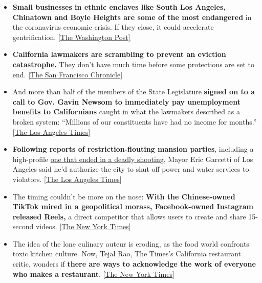 \begin{itemize}
\item
  \textbf{Small businesses in ethnic enclaves like South Los Angeles,
  Chinatown and Boyle Heights are some of the most endangered} in the
  coronavirus economic crisis. If they close, it could accelerate
  gentrification.
  {[}\href{https://www.washingtonpost.com/business/2020/07/31/ethnic-enclaves-gentrification-coronavirus/?arc404=true}{The
  Washington Post{]}}
\item
  \textbf{California lawmakers are scrambling to prevent an eviction
  catastrophe.} They don't have much time before some protections are
  set to end.
  {[}\href{https://www.sfchronicle.com/politics/article/Rent-is-coming-due-in-California-Two-weeks-to-15452787.php}{The
  San Francisco Chronicle}{]}
\item
  And more than half of the members of the State Legislature
  \textbf{signed on to a call to Gov. Gavin Newsom to immediately pay
  unemployment benefits to Californians} caught in what the lawmakers
  described as a broken system: ``Millions of our constituents have had
  no income for months.''
  {[}\href{https://www.latimes.com/california/story/2020-08-05/california-legislature-edd-changes-unemployment-benefits-newsom}{The
  Los Angeles Times}{]}
\item
  \textbf{Following reports of restriction-flouting mansion parties},
  including a high-profile
  \href{https://www.nytimes3xbfgragh.onion/2020/08/04/us/la-mansion-party-shooting.html}{one
  that ended in a deadly shooting}, Mayor Eric Garcetti of Los Angeles
  said he'd authorize the city to shut off power and water services to
  violators.
  {[}\href{https://www.latimes.com/california/story/2020-08-05/residents-holding-large-parties-may-have-their-water-and-power-shut-off-garcetti-says}{The
  Los Angeles Times}{]}
\item
  The timing couldn't be more on the nose: \textbf{With the
  Chinese-owned TikTok mired in a geopolitical morass, Facebook-owned
  Instagram released Reels,} a direct competitor that allows users to
  create and share 15-second videos.
  {[}\href{https://www.nytimes3xbfgragh.onion/2020/08/05/technology/tiktok-facebook-instagram-reels.html}{The
  New York Times}{]}
\item
  The idea of the lone culinary auteur is eroding, as the food world
  confronts toxic kitchen culture. Now, Tejal Rao, The Times's
  California restaurant critic, wonders if \textbf{there are ways to
  acknowledge the work of everyone who makes a restaurant}.
  {[}\href{https://www.nytimes3xbfgragh.onion/2020/08/04/dining/chef-restaurant-culture.html}{The
  New York Times}{]}
\end{itemize}

